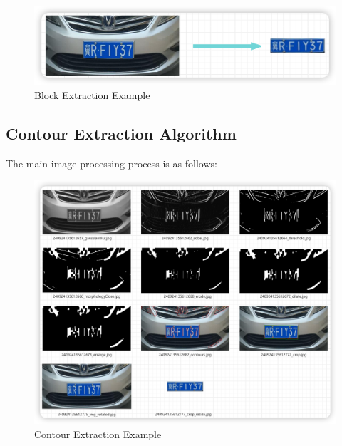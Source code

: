 \documentclass{article}
\begin{document}
	\begin{figure}[H]
		\centering
		\includegraphics[width=\linewidth]{mdpic/image-20240924224339600.png}
		\caption{Block Extraction Example}
	\end{figure}
	
	\subsection{Contour Extraction Algorithm}
	The main image processing process is as follows:
	\begin{figure}[H]
		\centering
		\includegraphics[width=\linewidth]{mdpic/image-20240924225915405.png}
		\caption{Contour Extraction Example}
	\end{figure}
	
\end{document}
